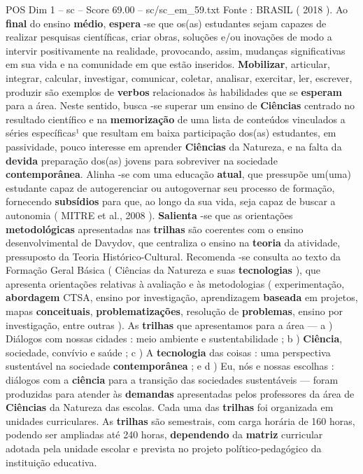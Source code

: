 \begin{textsample}{POS Dim 1 – sc – Score 69.00 – sc/sc\_em\_59.txt}
Fonte : BRASIL ( 2018 ).
Ao \textbf{final} do ensino \textbf{médio}, \textbf{espera} -se que os(as) estudantes sejam capazes de realizar pesquisas científicas, criar obras, soluções e/ou inovações de modo a intervir positivamente na realidade, provocando, assim, mudanças significativas em sua vida e na comunidade em que estão inseridos. \textbf{Mobilizar}, articular, integrar, calcular, investigar, comunicar, coletar, analisar, exercitar, ler, escrever, produzir são exemplos de \textbf{verbos} relacionados às habilidades que se \textbf{esperam} para a área.
Neste sentido, busca -se superar um ensino de \textbf{Ciências} centrado no resultado científico e na \textbf{memorização} de uma lista de conteúdos vinculados a séries específicas¹ que resultam em baixa participação dos(as) estudantes, em passividade, pouco interesse em aprender \textbf{Ciências} da Natureza, e na falta da \textbf{devida} preparação dos(as) jovens para sobreviver na sociedade \textbf{contemporânea}.
Alinha -se com uma educação \textbf{atual}, que pressupõe um(uma) estudante capaz de autogerenciar ou autogovernar seu processo de formação, fornecendo \textbf{subsídios} para que, ao longo da sua vida, seja capaz de buscar a autonomia ( MITRE et al., 2008 ). \textbf{Salienta} -se que as orientações \textbf{metodológicas} apresentadas nas \textbf{trilhas} são coerentes com o ensino desenvolvimental de Davydov, que centraliza o ensino na \textbf{teoria} da atividade, pressuposto da Teoria Histórico-Cultural.
Recomenda -se consulta ao texto da Formação Geral Básica ( Ciências da Natureza e suas \textbf{tecnologias} ), que apresenta orientações relativas à avaliação e às metodologias ( experimentação, \textbf{abordagem} CTSA, ensino por investigação, aprendizagem \textbf{baseada} em projetos, mapas \textbf{conceituais}, \textbf{problematizações}, resolução de \textbf{problemas}, ensino por investigação, entre outras ).
As \textbf{trilhas} que apresentamos para a área — a ) Diálogos com nossas cidades : meio ambiente e sustentabilidade ; b ) \textbf{Ciência}, sociedade, convívio e saúde ; c ) A \textbf{tecnologia} das coisas : uma perspectiva sustentável na sociedade \textbf{contemporânea} ; e d ) Eu, nós e nossas escolhas : diálogos com a \textbf{ciência} para a transição das sociedades sustentáveis — foram produzidas para atender às \textbf{demandas} apresentadas pelos professores da área de \textbf{Ciências} da Natureza das escolas.
Cada uma das \textbf{trilhas} foi organizada em unidades curriculares.
As \textbf{trilhas} são semestrais, com carga horária de 160 horas, podendo ser ampliadas até 240 horas, \textbf{dependendo} da \textbf{matriz} curricular adotada pela unidade escolar e prevista no projeto político-pedagógico da instituição educativa.

\end{textsample}
